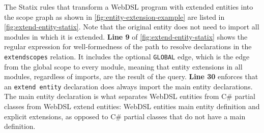     The Statix rules that transform a WebDSL program with extended entities into the scope graph as shown in \cref{fig:entity-extension-example} are listed in \cref{fig:extend-entity-statix}. Note that the original entity does not need to import all modules in which it is extended. \textbf{Line 9} of \cref{fig:extend-entity-statix} shows the regular expression for well-formedness of the path to resolve declarations in the \texttt{extendscopes} relation. It includes the optional \texttt{GLOBAL} edge, which is the edge from the global scope to every module, meaning that entity extensions in all modules, regardless of imports, are the result of the query. \textbf{Line 30} enforces that an \texttt{extend entity} declaration does always import the main entity declarations. The main entity declaration is what separates WebDSL entities from C\# partial classes from WebDSL extend entities: WebDSL entities main entity definition and explicit extensions, as opposed to C\# partial classes that do not have a main definition.


